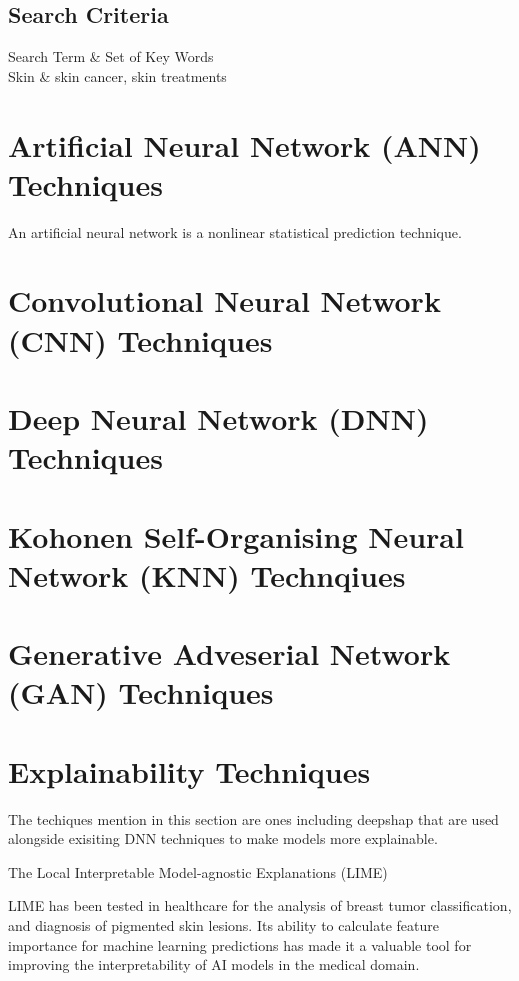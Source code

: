 \subsection{Search Criteria}

\begin{table}
	\begin{tabular}{}
	\hline
	Search Term & Set of Key Words \\
	\hline
	Skin & skin cancer, skin treatments
	\hline
	\end{tabular}

\end{table}

\section{Artificial Neural Network (ANN) Techniques}
An artificial neural network is a nonlinear statistical prediction technique.

\section{ Convolutional Neural Network (CNN) Techniques}

\section{Deep Neural Network (DNN) Techniques}

\section{Kohonen Self-Organising Neural Network (KNN) Technqiues}

\section{Generative Adveserial Network (GAN) Techniques}


\section{Explainability Techniques}
The techiques mention in this section are ones including deepshap that are used alongside exisiting DNN techniques to make models more explainable.

The Local Interpretable Model-agnostic Explanations (LIME)

LIME has been tested in healthcare for the analysis of breast tumor classification\cite{rafferty2022}, and diagnosis of pigmented skin lesions\cite{duell2021}. Its ability to calculate feature importance for machine learning predictions has made it a valuable tool for improving the interpretability of AI models in the medical domain.

